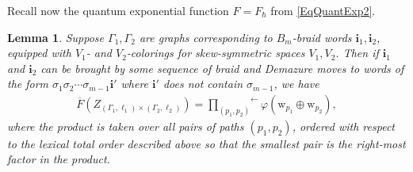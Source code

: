 \documentclass[11pt, reqno]{amsart}
\newtheorem{lemma}[theorem]{Lemma}
\theoremstyle{definition}
\numberwithin{equation}{section}
\begin{document}
Recall now the quantum exponential function $F = F_{\hbar}$ from \eqref{EqQuantExp2}. 
\begin{lemma}
\label{lem:dilog-product}
Suppose $\Gamma_1,\Gamma_2$ are graphs corresponding to $B_m$-braid words $\mathbf{i}_1,\mathbf{i}_2$,  equipped with $V_1$- and $V_2$-colorings for skew-symmetric spaces $V_1,V_2$. Then if $\mathbf{i}_1$ and $\mathbf{i}_2$ can be brought by some sequence of braid and Demazure moves to words of the form $\sigma_1\sigma_2\cdots \sigma_{m-1}\mathbf{i}'$ where $\mathbf{i}'$ does not contain $\sigma_{m-1}$, we have
\begin{align}
\label{eq:p-exp}
\overline{F}(Z_{(\Gamma_{1},\ell_1)\times (\Gamma_{2},\ell_2)}) = \overset{\longleftarrow}{\prod_{(p_1,p_2)}}\varphi(\mathrm{w}_{p_1}\oplus \mathrm{w}_{p_2}),
\end{align}
 where the product is taken over all pairs of paths $(p_1,p_2)$, ordered with respect to the lexical total order described above so that the smallest pair is the right-most factor in the product.
\end{lemma} 
\end{document}
